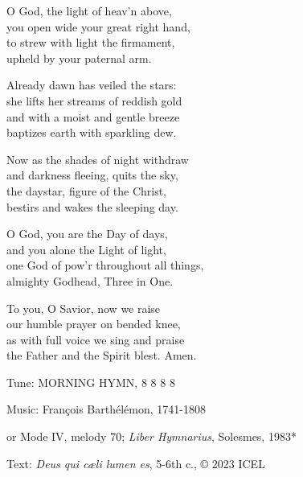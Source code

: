 \hymn

\begin{hymnverse}
O God, the light of heav’n above,\\
you open wide your great right hand,\\
to strew with light the firmament,\\
upheld by your paternal arm.

Already dawn has veiled the stars:\\
she lifts her streams of reddish gold\\
and with a moist and gentle breeze\\
baptizes earth with sparkling dew.

Now as the shades of night withdraw\\
and darkness fleeing, quits the sky,\\
the daystar, figure of the Christ,\\
bestirs and wakes the sleeping day.

O God, you are the Day of days,\\
and you alone the Light of light,\\
one God of pow’r throughout all things,\\
almighty Godhead, Three in One.

To you, O Savior, now we raise\\
our humble prayer on bended knee,\\
as with full voice we sing and praise\\
the Father and the Spirit blest. Amen.
\end{hymnverse}

\begin{hymnsource}
Tune: MORNING HYMN, 8 8 8 8

Music: François Barthélémon, 1741-1808

or Mode IV, melody 70; \emph{Liber Hymnarius}, Solesmes, 1983*

Text: \emph{Deus qui cæli lumen es}, 5-6th c., © 2023 ICEL
\end{hymnsource}